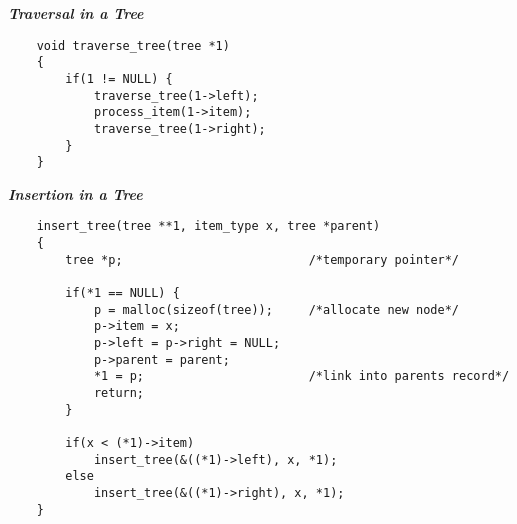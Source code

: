\textbf{ \emph{Traversal in a Tree} }\\

\begin{verbatim}
    void traverse_tree(tree *1)
    {
        if(1 != NULL) {
            traverse_tree(1->left);
            process_item(1->item);
            traverse_tree(1->right);
        }
    }
\end{verbatim}

\textbf{ \emph{Insertion in a Tree} }\\

\begin{verbatim}
    insert_tree(tree **1, item_type x, tree *parent)
    {
        tree *p;                          /*temporary pointer*/

        if(*1 == NULL) {
            p = malloc(sizeof(tree));     /*allocate new node*/
            p->item = x;
            p->left = p->right = NULL;
            p->parent = parent;
            *1 = p;                       /*link into parents record*/
            return;
        }

        if(x < (*1)->item)
            insert_tree(&((*1)->left), x, *1);
        else
            insert_tree(&((*1)->right), x, *1);
    }
\end{verbatim}

